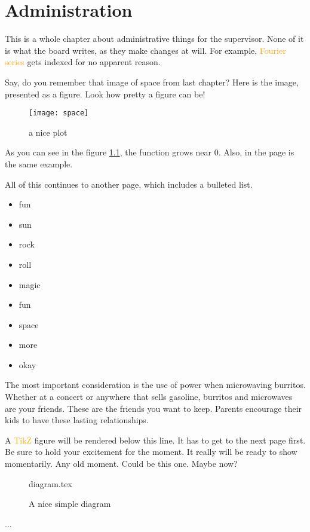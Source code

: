 \documentclass[float=false, crop=false]{standalone}
\begin{document}
\chapter{Administration}
This is a whole chapter about administrative things for the supervisor. None of it is what the board writes, as they make changes at will. For example, \textcolor{orange}{Fourier series}
 gets indexed for no apparent reason.

Say, do you remember that image of space from last chapter? Here is the image, presented as a figure. Look how pretty a figure can be!
\begin{figure}[h]
    \centering
    \texttt{[image: space]}
    \caption{a nice plot}
    \label{fig:space1}
\end{figure}
 
As you can see in the figure \ref{fig:space1}, the 
function grows near 0. Also, in the page \pageref{fig:space1} 
is the same example.
 
All of this continues to another page, which includes a bulleted list.
\begin{itemize}
\item fun
\item sun 
\item rock
\item roll
\item magic
\item fun
\item space
\item more
\item okay
\end{itemize}


The most important consideration is the use of power when microwaving burritos. Whether at a concert or anywhere that sells gasoline, burritos and microwaves are your friends. These are the friends you want to keep. Parents encourage their kids to have these lasting relationships. 

A \textcolor{orange}{TikZ}
 figure will be rendered below this line. It has to get to the next page first. Be sure to hold your excitement for the moment. It really will be ready to show momentarily. Any old moment. Could be this one. Maybe now? 
 \begin{figure}[ht]
 {diagram.tex}
 \label{fig:tikzexample}
\caption{A nice simple diagram}
\end{figure}
 ...
\end{document}
